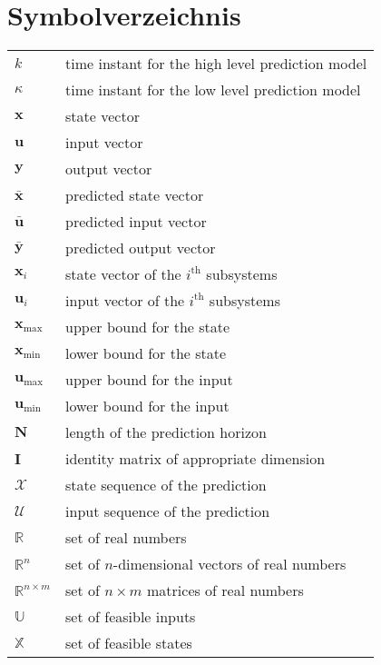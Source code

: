 
\allowdisplaybreaks
\chapter*{\bfseries Symbolverzeichnis}
\thispagestyle{empty}
\vspace{-.5em} %
\begin{tabular}{@{} p{\figurelabelwidth} @{} p{\textwidth-\figurelabelwidth}}
$k$ 				 & time instant for the high level prediction model\\
$\kappa$ 			 & time instant for the low level prediction model\\
$\bm{x}$	  		 & state vector\\
$\bm{u}$		  	 & input vector\\
$\bm{y}$		  	 & output vector\\
$\bm{\bar{x}}$  	 & predicted state vector\\
$\bm{\bar{u}}$  	 & predicted input vector\\
$\bm{\bar{y}}$  	 & predicted output vector\\
$\bm{x}_{i}$	 	 & state vector of the $i^{\text{th}}$ subsystems\\
$\bm{u}_{i}$	 	 & input vector of the $i^{\text{th}}$ subsystems\\
$\bm{x}_{\max}$ 	 & upper bound for the state\\
$\bm{x}_{\min}$	 & lower bound for the state\\
$\bm{u}_{\max}$	 & upper bound for the input\\
$\bm{u}_{\min}$ 	 & lower bound for the input\\
$\bm{N}$	 	 	 & length of the prediction horizon\\
$\bm{I}$	 	 	 & identity matrix of appropriate dimension\\
$\mathcal{X}$	  	 & state sequence of the prediction\\
$\mathcal{U}$	 	 & input sequence of the prediction\\
$\mathbb{R}$	  	 & set of real numbers\\
$\mathbb{R}^{n}$& set of $n$-dimensional vectors of real numbers\\
$\mathbb{R}^{n \times m}$ & set of $n \times m$ matrices of real numbers\\
$\mathbb{U}$	  	 & set of feasible inputs\\
$\mathbb{X}$	  	 & set of feasible states\\
\end{tabular}                   
\cleardoublepage

